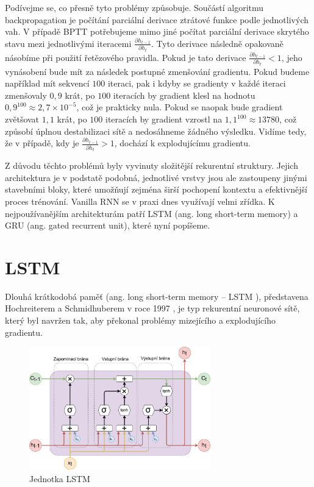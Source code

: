 Podívejme se, co přesně tyto problémy způsobuje. Součástí algoritmu
backpropagation je počítání parciální derivace ztrátové funkce podle
jednotlivých vah. V případě BPTT potřebujeme mimo jiné počítat parciální
derivace skrytého stavu mezi jednotlivými iteracemi $\frac{\partial
        h_{t-1}}{\partial h_t}$. Tyto derivace následně opakovaně násobíme při použití
řetězového pravidla. Pokud je tato derivace $\frac{\partial h_{t-1}}{\partial
        h_t}<1$, jeho vynásobení bude mít za následek postupné zmenšování gradientu.
Pokud budeme například mít sekvencí $100$ iteraci, pak i kdyby se gradienty v
každé iteraci zmenšovaly $0,9$ krát, po $100$ iteracích by gradient klesl na
hodnotu $0,9^{100} \approx 2,7 \times 10^{-5}$, což je prakticky nula. Pokud se
naopak bude gradient zvětšovat $1,1$ krát, po $100$ iteracích by gradient
vzrostl na $1,1^{100} \approx 13 780$, což způsobí úplnou destabilizaci sítě a
nedosáhneme žádného výsledku. Vidíme tedy, že v případě, kdy je $\frac{\partial
        h_{t-1}}{\partial h_t}>1$, dochází k explodujícímu gradientu.

Z důvodu těchto problémů byly vyvinuty složitější rekurentní struktury. Jejich
architektura je v podstatě podobná, jednotlivé vrstvy jsou ale zastoupeny
jinými stavebními bloky, které umožňují zejména širší pochopení kontextu a
efektivnější proces trénování. Vanilla RNN se v praxi dnes využívají velmi
zřídka. K nejpoužívanějším architekturám patří LSTM (ang. long short-term
memory) a GRU (ang. gated recurrent unit), které nyní popíšeme.

\section{LSTM}

Dlouhá krátkodobá paměť (ang. long short-term memory – LSTM ), představena
Hochreiterem a Schmidhuberem v roce 1997 \cite{lstm}, je typ rekurentní
neuronové sítě, který byl navržen tak, aby překonal problémy mizejícího a
explodujícího gradientu.

\begin{figure}[]
    \centering
    \includegraphics[width=0.7\textwidth]{Figures/LSTM_unit.pdf}
    \caption{Jednotka LSTM}
    \label{fig:lstm}
\end{figure}

